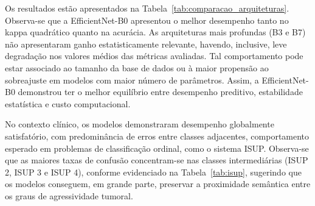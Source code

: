 Os resultados estão apresentados na Tabela~\ref{tab:comparacao_arquiteturas}. Observa-se que a EfficientNet-B0 apresentou o melhor desempenho tanto no kappa quadrático quanto na acurácia. As arquiteturas mais profundas (B3 e B7) não apresentaram ganho estatisticamente relevante, havendo, inclusive, leve degradação nos valores médios das métricas avaliadas. Tal comportamento pode estar associado ao tamanho da base de dados ou à maior propensão ao sobreajuste em modelos com maior número de parâmetros. Assim, a EfficientNet-B0 demonstrou ter o melhor equilíbrio entre desempenho preditivo, estabilidade estatística e custo computacional. 

\begin{table}[h]
\centering
{}
\caption{Comparação de desempenho entre as variantes da EfficientNet.}
\label{tab:comparacao_arquiteturas}
\end{table}

No contexto clínico, os modelos demonstraram desempenho globalmente satisfatório, com predominância de erros entre classes adjacentes, comportamento esperado em problemas de classificação ordinal, como o sistema ISUP. Observa-se que as maiores taxas de confusão concentram-se nas classes intermediárias (ISUP 2, ISUP 3 e ISUP 4), conforme evidenciado na Tabela~\ref{tab:isup}, sugerindo que os modelos conseguem, em grande parte, preservar a proximidade semântica entre os graus de agressividade tumoral. 


